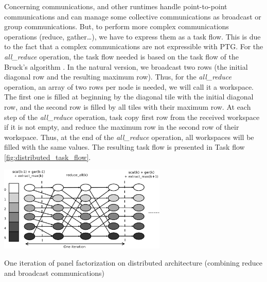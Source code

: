 Concerning communications, \dague and other runtimes handle point-to-point communications and can manage some collective communications as broadcast or group communications. But, to perform more complex communications operations (reduce, gather\dots), we have to express them as a task flow. 
This is due to the fact that a complex communications are not expressible with PTG. For the \emph{all\_reduce} operation, the task flow needed is based on the task flow of the Bruck's algorithm \cite{BruckEtAl97}.
In the natural version, we broadcast two rows (the initial diagonal row and the resulting maximum row). Thus, for the \emph{all\_reduce} operation, an array of two rows per node is needed, we will call it a workspace. The first one is filled at beginning by the diagonal tile with the initial diagonal row, and the second row is filled by all tiles with their maximum row. At each step of the \textit{all\_reduce} operation, task copy first row from the received workspace if it is not empty, and reduce the maximum row in the second row of their workspace. Thus, at the end of the \textit{all\_reduce} operation, all workspaces will be filled with the same values.
The resulting task flow is presented in Task flow \ref{fig:distributed_task_flow}.

\begin{taskflow}[!ht]
\centering
\includegraphics[width=0.6\textwidth]{figures/distributed_tf_bw.pdf}
\caption{One iteration of panel factorization on distributed architecture (combining reduce and broadcast communications)\label{fig:distributed_task_flow}}

\end{taskflow}


